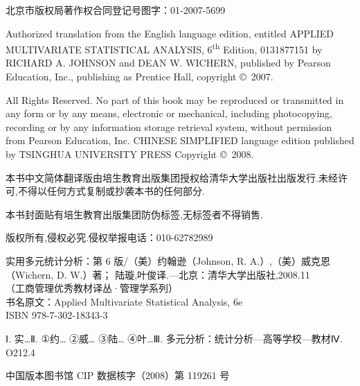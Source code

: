 \clearpage
\thispagestyle{empty}
{
\noindent 北京市版权局著作权合同登记号\quad 图字：01-2007-5699

\vspace{8pt}
\noindent Authorized translation from the English language edition, entitled APPLIED MULTIVARIATE
STATISTICAL ANALYSIS, 6\textsuperscript{th} Edition, 0131877151 by RICHARD A. JOHNSON and DEAN W.
WICHERN, published by Pearson Education, Inc., publishing as Prentice Hall, copyright \copyright\ 2007.

\vspace{5pt}
\noindent All Rights Reserved. No part of this book may be reproduced or transmitted in any form or by any
means, electronic or mechanical, including photocopying, recording or by any information storage retrieval
system, without permission from Pearson Education, Inc. CHINESE SIMPLIFIED language edition
published by TSINGHUA UNIVERSITY PRESS Copyright \copyright\ 2008.

\vspace{5pt}
\noindent 本书中文简体翻译版由培生教育出版集团授权给清华大学出版社出版发行.未经许可,不得以任何方式复制或抄袭本书的任何部分.

\vspace{3pt}
\noindent 本书封面贴有培生教育出版集团防伪标签,无标签者不得销售.

\noindent 版权所有,侵权必究.侵权举报电话：010-62782989

\vspace{8pt}

\vspace{3pt}
\noindent 实用多元统计分析：第 6 版/（美）约翰逊（Johnson, R. A.）,（美）威克恩（Wichern, D. W.）著；
陆璇,叶俊译.—北京：清华大学出版社,2008.11\\
（工商管理优秀教材译丛·管理学系列）\\
书名原文：Applied Multivariate Statistical Analysis, 6e\\
ISBN 978-7-302-18343-3

\vspace{3pt}
\noindent Ⅰ. 实…\quad Ⅱ. ①约… ②威… ③陆… ④叶…\quad Ⅲ. 多元分析：统计分析—高等学校—教材\quad Ⅳ. O212.4

\vspace{3pt}
\noindent 中国版本图书馆 CIP 数据核字（2008）第 119261 号

}
